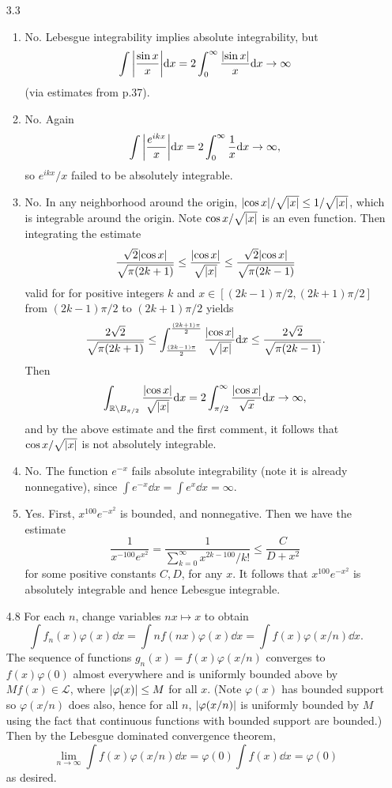 \documentclass[11pt]{article}
\begin{document}
\begin{enumerate}
    \item[3.3] \begin{enumerate}
        \item No. Lebesgue integrability implies absolute integrability, but \[\int \abs{\frac{\sin x}{x}}\dd x = 2\int_0^\infty \frac{\abs{\sin x}}{x}\dd x \to \infty\] (via estimates from p.37).
        \item No. Again \[\int \abs{\frac{e^{ikx}}{x}}\dd x = 2\int_0^\infty \frac{1}{x}\dd x\to \infty ,\] so $e^{ikx}/x$ failed to be absolutely integrable.
        \item No. In any neighborhood around the origin, $\abs{ \cos x}/\sqrt{\abs{x}}\leq 1/\sqrt{\abs{x}}$, which is integrable around the origin. Note $\cos x/\sqrt{\abs{x}}$ is an even function. Then integrating the estimate \[\frac{\sqrt 2\abs{\cos x}}{\sqrt{\pi(2k+1)}}\leq \frac{\abs{\cos x}}{\sqrt{\abs{x}}}\leq \frac{\sqrt 2\abs{\cos x}}{\sqrt{\pi(2k-1)}}\] valid for for positive integers $k$ and $x\in [(2k-1)\pi/2,(2k+1)\pi/2]$ from $(2k-1)\pi/2$ to $(2k+1)\pi/2$ yields \[\frac{2\sqrt 2}{\sqrt{\pi(2k+1)}}\leq \int_{\frac{(2k-1)\pi}{2}}^{\frac{(2k+1)\pi}{2}}\frac{\abs{\cos x}}{\sqrt{\abs{x}}}\dd x\leq \frac{2\sqrt 2}{\sqrt{\pi(2k-1)}}.\] Then \[\int_{\mathbb{R}\setminus B_{\pi/2}} \frac{\abs{\cos x}}{\sqrt{\abs{x}}}\dd x = 2\int_{\pi/2}^\infty \frac{\abs{\cos x}}{\sqrt{x}}\dd x\to \infty,\] and by the above estimate and the first comment, it follows that $\cos x /\sqrt{\abs{x}}$ is not absolutely integrable.
        \item No. The function $e^{-x}$ fails absolute integrability (note it is already nonnegative), since $\int e^{-x}\dd x = \int e^x \dd x = \infty$.
        \item Yes. First, $x^{100}e^{-x^2}$ is bounded, and nonnegative. Then we have the estimate \[\frac{1}{x^{-100}e^{x^2}} = \frac{1}{\sum_{k=0}^\infty x^{2k-100}/k!}\leq \frac{C}{D+x^2}\] for some positive constants $C,D$, for any $x$. It follows that $x^{100}e^{-x^2}$ is absolutely integrable and hence Lebesgue integrable.
    \end{enumerate}
    \hrulefill
    \item[4.8] For each $n$, change variables $nx\mapsto x$ to obtain \[\int f_n(x)\varphi(x)\dd x = \int nf(nx)\varphi(x)\dd x = \int f(x)\varphi(x/n)\dd x.\] The sequence of functions $g_n(x) = f(x)\varphi(x/n)$ converges to $f(x)\varphi(0)$ almost everywhere and is uniformly bounded above by $Mf(x)\in \mathcal L$, where $\abs{\varphi(x)}\leq M$ for all $x$. (Note $\varphi(x)$ has bounded support so $\varphi(x/n)$ does also, hence for all $n$, $\abs{\varphi(x/n)}$ is uniformly bounded by $M$ using the fact that continuous functions with bounded support are bounded.) Then by the Lebesgue dominated convergence theorem, \[\lim_{n\to\infty} \int f(x)\varphi(x/n)\dd x = \varphi(0)\int f(x)\dd x= \varphi(0)\] as desired.
    

\end{enumerate}
\end{document}
